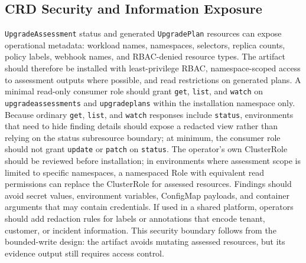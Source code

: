 \documentclass[10pt,journal]{IEEEtran}
\newcommand{\crd}[1]{\texttt{#1}}
\newcommand{\code}[1]{\texttt{#1}}
\begin{document}
\subsection{CRD Security and Information Exposure}
\crd{UpgradeAssessment} status and generated \crd{UpgradePlan} resources can expose operational metadata: workload names, namespaces, selectors, replica counts, policy labels, webhook names, and RBAC-denied resource types. The artifact should therefore be installed with least-privilege RBAC, namespace-scoped access to assessment outputs where possible, and read restrictions on generated plans. A minimal read-only consumer role should grant \code{get}, \code{list}, and \code{watch} on \crd{upgradeassessments} and \crd{upgradeplans} within the installation namespace only. Because ordinary \code{get}, \code{list}, and \code{watch} responses include \code{status}, environments that need to hide finding details should expose a redacted view rather than relying on the status subresource boundary; at minimum, the consumer role should not grant \code{update} or \code{patch} on \code{status}. The operator's own ClusterRole should be reviewed before installation; in environments where assessment scope is limited to specific namespaces, a namespaced Role with equivalent read permissions can replace the ClusterRole for assessed resources. Findings should avoid secret values, environment variables, ConfigMap payloads, and container arguments that may contain credentials. If used in a shared platform, operators should add redaction rules for labels or annotations that encode tenant, customer, or incident information. This security boundary follows from the bounded-write design: the artifact avoids mutating assessed resources, but its evidence output still requires access control.
\end{document}
